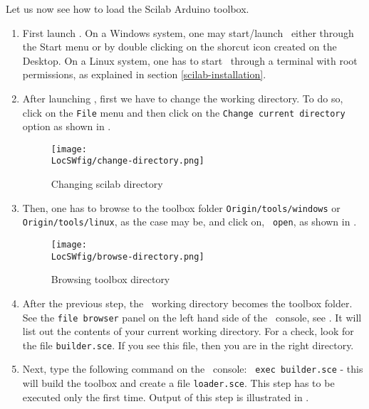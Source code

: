 Let us now see how to load the Scilab Arduino toolbox. 
\begin{enumerate}
      \item First launch \scilab. On a Windows system, one may start/launch
            \scilab\ either through the Start menu or by double clicking on the
            shorcut icon created on the Desktop. On a Linux system, one has to
            start \scilab\ through a terminal with root permissions, as
            explained in section \ref{scilab-installation}.
      \item After launching \scilab, first we have to change the working
            directory. To do so, click on the {\tt File} menu and then click on
            the {\tt Change current directory} option as shown in
            .
            \begin{figure}
                  \centering
                  \texttt{[image: \\LocSWfig/change-directory.png]}
                  \caption{Changing scilab directory}
                  \label{scilab-cd}
            \end{figure}
      \item Then, one has to browse to the toolbox folder
                  {\tt Origin/tools/windows} or {\tt Origin/tools/linux}, as the case
            may be, and click on, {\tt
                        open}, as shown in .
            \begin{figure}
                  \centering
                  \texttt{[image: \\LocSWfig/browse-directory.png]}
                  \caption{Browsing toolbox directory}
                  \label{scilab-browse}
            \end{figure}
      \item After the previous step, the \scilab\ working directory becomes
            the toolbox folder.  See the {\tt file browser} panel on the
            left hand side of the \scilab\ console, see .  It
            will list out the contents of your current working directory. For a
            check, look for the file {\tt builder.sce}.  If you see this file,
            then you are in the right directory.
      \item Next, type the following command on the \scilab\ console: {\tt
            exec builder.sce} - this will build the toolbox and create a file
                  {\tt loader.sce}. This step has to be executed only the first
            time. Output of this step is illustrated in .
            \begin{figure}

\end{figure}
\end{enumerate}
